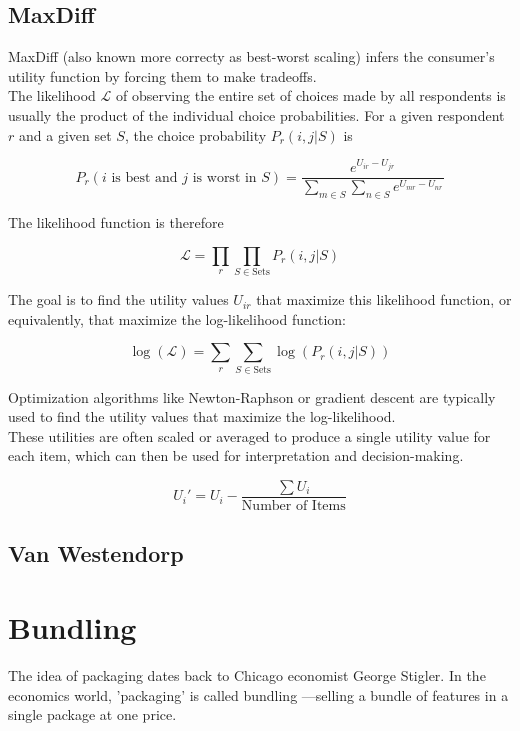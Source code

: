 \documentclass{article}
\begin{document}
\subsection{MaxDiff}

MaxDiff (also known more correcty as best-worst scaling) infers the consumer's utility function by forcing them to make tradeoffs. \\

The likelihood $\mathcal{L}$ of observing the entire set of choices made by all respondents is usually the product of the individual choice probabilities. For a given respondent $r$ and a given set $S$, the choice probability $P_r(i,j|S)$ is

\[
P_r(i \text{ is best and } j \text{ is worst in } S) = \frac{e^{U_{ir} - U_{jr}}}{\sum_{m \in S} \sum_{n \in S} e^{U_{mr} - U_{nr}}}
\]

The likelihood function is therefore 

\[
\mathcal{L} = \prod_{r} \prod_{S \in \text{Sets}} P_r(i, j | S)
\]

The goal is to find the utility values $U_{ir}$ that maximize this likelihood function, or equivalently, that maximize the log-likelihood function:

\[
\log(\mathcal{L}) = \sum_{r} \sum_{S \in \text{Sets}} \log(P_r(i, j | S))
\]

Optimization algorithms like Newton-Raphson or gradient descent are typically used to find the utility values that maximize the log-likelihood. \\

These utilities are often scaled or averaged to produce a single utility value for each item, which can then be used for interpretation and decision-making.

\[
U_i' = U_i - \frac{\sum U_i}{\text{Number of Items}}
\]



\subsection{Van Westendorp}

\section{Bundling}
 The idea of packaging dates back to Chicago economist George Stigler. In the economics world, 'packaging' is called bundling —selling a bundle of features in a single package at one price.  \\
\end{document}
